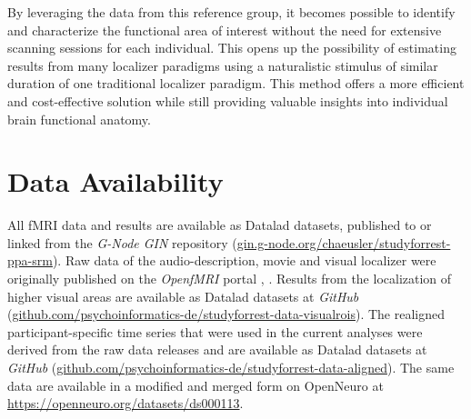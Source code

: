 %
By leveraging the data from this reference group, it becomes possible to
identify and characterize the functional area of interest without the need for
extensive scanning sessions for each individual.
%
This opens up the possibility of estimating results from many localizer
paradigms using a naturalistic stimulus of similar duration of one traditional
localizer paradigm.
%
This method offers a more efficient and cost-effective solution while still
providing valuable insights into individual brain functional anatomy.

\normalsize



\section*{Data Availability}


All fMRI data and results are available as Datalad \citep{halchenko2021datalad}
datasets, published to or linked from the \emph{G-Node GIN} repository
(\href{https://gin.g-node.org/chaeusler/studyforrest-ppa-srm}{\url{gin.g-node.org/chaeusler/studyforrest-ppa-srm}}).
Raw data of the audio-description, movie and visual localizer were originally
published on the \emph{OpenfMRI} portal
\citep[\url{https://legacy.openfmri.org/dataset/ds000113},][]
{Hanke2014ds000113}, \space
\citep[\url{https://legacy.openfmri.org/dataset/ds000113d},][]
{hanke2016ds000113d}.
Results from the localization of higher visual areas are available as Datalad
datasets at \emph{GitHub}
(\href{https://github.com/psychoinformatics-de/studyforrest-data-visualrois}{\url{github.com/psychoinformatics-de/studyforrest-data-visualrois}}).
The realigned participant-specific time series that were used in the current
analyses were derived from the raw data releases and are available as Datalad
datasets at \emph{GitHub}
(\href{https://github.com/psychoinformatics-de/studyforrest-data-aligned}{\url{github.com/psychoinformatics-de/studyforrest-data-aligned}}).
The same data are available in a modified and merged form on OpenNeuro at
\url{https://openneuro.org/datasets/ds000113}.


